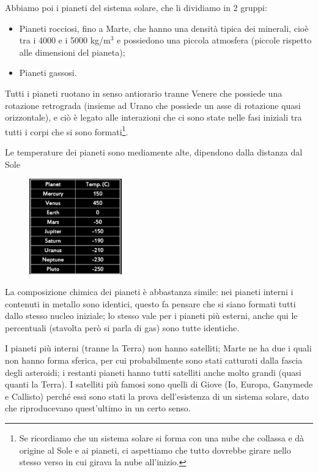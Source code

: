 \vspace{0.2cm}Abbiamo poi i pianeti del sistema solare, che li dividiamo in 2 gruppi:

\begin{itemize}
    \item Pianeti rocciosi, fino a Marte, che hanno una densità tipica dei minerali, cioè tra i 4000 e i 5000 kg/m$^{3}$ e possiedono una piccola atmosfera (piccole rispetto alle dimensioni del pianeta);
    \item Pianeti gassosi.
\end{itemize}

Tutti i pianeti ruotano in senso antiorario tranne Venere che possiede una rotazione retrograda (insieme ad Urano che possiede un asse di rotazione quasi orizzontale), e ciò è legato alle interazioni che ci sono state nelle fasi iniziali tra tutti i corpi che si sono formati\footnote{Se ricordiamo che un sistema solare si forma con una nube che collassa e dà origine al Sole e ai pianeti, ci aspettiamo che tutto dovrebbe girare nello stesso verso in cui girava la nube all'inizio.}.

Le temperature dei pianeti sono mediamente alte, dipendono dalla distanza dal Sole

\begin{figure}[H]
    \centering
    \includegraphics[width=4cm]{Temperature.JPG}
\end{figure}

La composizione chimica dei pianeti è abbastanza simile: nei pianeti interni i contenuti in metallo sono identici, questo fa pensare che si siano formati tutti dallo stesso nucleo iniziale; lo stesso vale per i pianeti più esterni, anche qui le percentuali (stavolta però si parla di gas) sono tutte identiche.

I pianeti più interni (tranne la Terra) non hanno satelliti; Marte ne ha due i quali non hanno forma sferica, per cui probabilmente sono stati catturati dalla fascia degli asteroidi; i restanti pianeti hanno tutti satelliti anche molto grandi (quasi quanti la Terra). I satelliti più famosi sono quelli di Giove (Io, Europa, Ganymede e Callisto) perché essi sono stati la prova dell'esistenza di un sistema solare, dato che riproducevano quest'ultimo in un certo senso.

